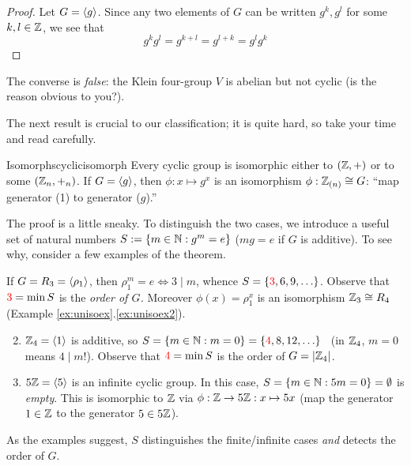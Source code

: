 \begin{proof}
	Let $G=\left\langle g\right\rangle$. Since any two elements of $G$ can be written $g^k,g^l$ for some $k,l\in\mathbb{Z}$, we see that
	\[
		g^kg^l=g^{k+l}=g^{l+k}=g^lg^k\tag*{\qedhere}
	\]
\end{proof}

The converse is \emph{false}: the Klein four-group $V$ is abelian but not cyclic (is the reason obvious to you?).\smallbreak

The next result is crucial to our classification; it is quite hard, so take your time and read carefully.


\begin{thm}{Isomorphs}{cyclicisomorph}
	Every cyclic group is isomorphic either to $(\mathbb{Z},+)$ or to some $(\mathbb{Z}_n,+_n)$.\smallbreak
	If $G=\left\langle g\right\rangle$, then $\phi:x\mapsto g^x$ is an isomorphism $\phi:\mathbb{Z}_{(n)}\cong G$: ``map generator (1) to generator ($g$).''
\end{thm}

The proof is a little sneaky. To distinguish the two cases, we introduce a useful set of natural numbers $S:=\{m\in\mathbb{N}:g^m=e\}$ ($mg=e$ if $G$ is additive). To see why, consider a few examples of the theorem.

\begin{examples}{}{}
	\exstart If $G=R_3=\left\langle \rho_1\right\rangle$, then $\rho_1^m=e\iff 3\mid m$, whence $S=\{\textcolor{red}{3},6,9,\ldots\}$. Observe that $\textcolor{red}{3}=\min S$ is the \emph{order of $G$.} Moreover $\phi(x)=\rho_1^x$ is an isomorphism $\mathbb{Z}_3\cong R_4$ (Example \ref*{ex:unisoex}.\ref{ex:unisoex2}).
	\begin{enumerate}\setcounter{enumi}{1}
	  \item $\mathbb{Z}_4=\left\langle 1\right\rangle$ is additive, so $S=\{m\in\mathbb{N}:m=0\}=\{\textcolor{red}{4},8,12,\ldots\}$ \ (in $\mathbb{Z}_4$, $m=0$ means $4\mid m$!). Observe that $\textcolor{red}{4}=\min S$ is the order of $G=\left| \mathbb{Z}_4\right|$.
	  \item $5\mathbb{Z}=\left\langle 5\right\rangle$ is an infinite cyclic group. In this case, $S=\{m\in\mathbb{N}:5m=0\}=\emptyset$ is \emph{empty}. This is isomorphic to $\mathbb{Z}$ via $\phi:\mathbb{Z}\to 5\mathbb{Z}:x\mapsto 5x$ (map the generator $1\in\mathbb{Z}$ to the generator $5\in 5\mathbb{Z}$).
	\end{enumerate}
\end{examples}

As the examples suggest, $S$ distinguishes the finite/infinite cases \emph{and} detects the order of $G$.

